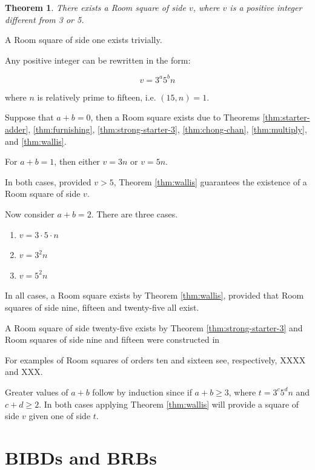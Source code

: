 \documentclass[
  11pt,
  a4paper]{book}\usepackage[]{graphicx}\usepackage[]{xcolor}
\newtheorem{theorem}{Theorem}
\newcounter{example}
\begin{document}
\begin{theorem}
There exists a Room square of side $v$, where $v$
is a positive integer different from 3 or 5.
\end{theorem}

A Room square of side one exists trivially.

Any positive integer can be rewritten in the form:

\begin{equation}
v = 3^{a}5^{b}n
\end{equation}

where $n$ is relatively prime to fifteen, i.e.
$(15, n) = 1$.

Suppose that $a + b = 0$, then a Room square exists
due to Theorems
\ref{thm:starter-adder},
\ref{thm:furnishing},
\ref{thm:strong-starter-3},
\ref{thm:chong-chan},
\ref{thm:multiply},
and
\ref{thm:wallis}.

For $a + b = 1$, then either $v = 3n$ or $v = 5n$.

In both cases, provided $v > 5$, Theorem \ref{thm:wallis} guarantees the
existence of a Room square of side $v$.

Now consider $a + b = 2$. There are three cases.

\begin{enumerate}
  \item{$v = 3\cdot 5\cdot n$}
  \item{$v = 3^{2}n$}
  \item{$v = 5^{2}n$}
\end{enumerate}

In all cases, a Room square exists by Theorem \ref{thm:wallis}, provided
that Room squares of side nine, fifteen and twenty-five all exist.

A Room square of side twenty-five exists by
Theorem \ref{thm:strong-starter-3}
and Room squares of side nine
and fifteen were constructed in
\cite{mullinFurnishingRoomSquares1969}

For examples of Room squares of orders ten and sixteen see,
respectively, XXXX and XXX.

Greater values of $a + b$ follow by induction since if
$a + b \geq 3$, where $t = 3^{c}5^{d}n$ and
$c + d \geq 2$. In both cases applying Theorem \ref{thm:wallis} will
provide a square of side $v$ given one of side $t$.

      

\chapter{BIBDs and BRBs}
\end{document}
